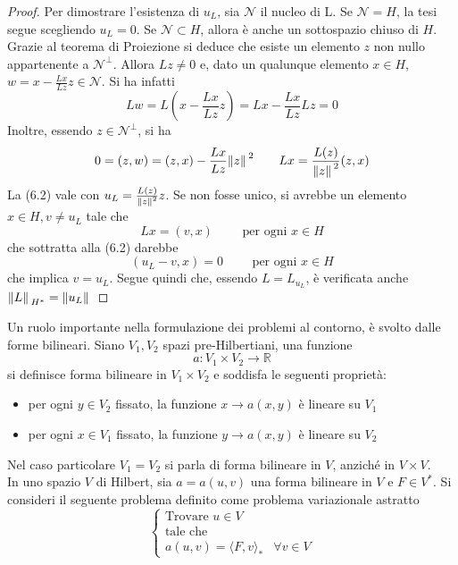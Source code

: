 \documentclass[a4paper,12pt, draft]{article}
\theoremstyle{break}
\numberwithin{equation}{section}
\begin{document}
\begin{proof}
  Per dimostrare l'esistenza di \(u_L\), sia \(\mathcal{N}\) il nucleo di L. Se \(\mathcal{N} = H\), la tesi segue scegliendo \(u_L = 0\). Se \(\mathcal{N} \subset H\), allora è anche un sottospazio chiuso di \(H\). \\
  Grazie al teorema di Proiezione si deduce che esiste un elemento \(z\) non nullo appartenente a \(\mathcal{N}^{\perp}\). Allora \(Lz \not = 0\) e, dato un qualunque elemento \(x \in H\), \(w = x - \frac{Lx}{Lz}z \in \mathcal{N}\). Si ha infatti 
  \[
    Lw = L\left(x - \frac{Lx}{Lz}z\right) = Lx - \frac{Lx}{Lz}Lz =0
  \]
  Inoltre, essendo \(z \in \mathcal{N}^{\perp}\), si ha 
  \[
  0 = (z,w) = (z,x) -\frac{Lx}{Lz}\norm*{z}^2 \qquad Lx = \frac{L(z)}{\norm*{z}^2}(z,x)
  \]
  La (6.2) vale con \(u_L = \frac{L(z)}{\norm*{z}^2}z\).
  Se non fosse unico, si avrebbe un elemento \(x \in H, v \not = u_L\) tale che 
  \[
    Lx = (v,x) \qquad \mbox{ per ogni }x \in H
  \]
  che sottratta alla (6.2) darebbe
  \[
  (u_L -v, x) = 0 \qquad \mbox{ per ogni } x \in H  
  \]
  che implica \(v = u_L\). Segue quindi che, essendo \(L = L_{u_L}\), è verificata anche \(\norm*{L}_{H^*} = \norm*{u_L}\)
\end{proof}
Un ruolo importante nella formulazione dei problemi al contorno, è svolto dalle forme bilineari. Siano \(V_1, V_2\) spazi pre-Hilbertiani, una funzione
\[
  a: V_1 \times V_2 \to \mathbb{R}
\]
si definisce forma bilineare in \(V_1 \times V_2\) e soddisfa le seguenti proprietà:
\begin{itemize}
  \item per ogni \(y \in V_2\) fissato, la funzione \(x \longrightarrow a(x,y)\) è lineare su \(V_1\)
  \item per ogni \(x \in V_1\) fissato, la funzione \(y \longrightarrow a(x,y)\) è lineare su \(V_2\)
\end{itemize}
Nel caso particolare \(V_1 = V_2\) si parla di forma bilineare in \(V\), anziché in \(V \times V\). \\
In uno spazio \(V\) di Hilbert, sia \(a = a(u,v)\) una forma bilineare in \(V\) e \(F \in V^*\). Si consideri il seguente problema definito come problema variazionale astratto 
\begin{equation}
  \begin{cases}
    \mbox{Trovare } u \in V \\
    \mbox{tale che} \\
    a(u,v) = \langle F,v \rangle_* & \forall v \in V
  \end{cases}
\end{equation}
\end{document}
